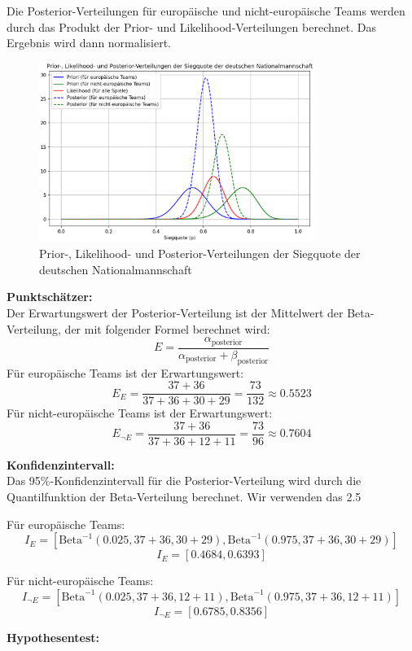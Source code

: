 \documentclass[a4paper,12pt]{article}
\begin{document}
Die Posterior-Verteilungen für europäische und nicht-europäische Teams werden durch das Produkt der Prior- und Likelihood-Verteilungen berechnet. Das Ergebnis wird dann normalisiert.

\begin{figure}[htbp]
  \centering
  \includegraphics[width=0.8\textwidth]{../images/world_cup.png}
  \caption{Prior-, Likelihood- und Posterior-Verteilungen der Siegquote der deutschen Nationalmannschaft}
\end{figure}

\textbf{Punktschätzer:} \\
Der Erwartungswert der Posterior-Verteilung ist der Mittelwert der Beta-Verteilung, der mit folgender Formel berechnet wird:
\[
E = \frac{\alpha_{\text{posterior}}}{\alpha_{\text{posterior}} + \beta_{\text{posterior}}}
\]
Für europäische Teams ist der Erwartungswert:
\[
E_E = \frac{37 + 36}{37 + 36 + 30 + 29} = \frac{73}{132} \approx 0.5523
\]
Für nicht-europäische Teams ist der Erwartungswert:
\[
E_{\neg E}= \frac{37 + 36}{37 + 36 + 12 + 11} = \frac{73}{96} \approx 0.7604
\]

\textbf{Konfidenzintervall:} \\
Das 95\%-Konfidenzintervall für die Posterior-Verteilung wird durch die Quantilfunktion der Beta-Verteilung berechnet. Wir verwenden das 2.5%

Für europäische Teams:
\[
I_E= \left[ \text{Beta}^{-1}(0.025, 37 + 36, 30 + 29), \text{Beta}^{-1}(0.975, 37 + 36, 30 + 29) \right]
\]
\[
I_E = [0.4684, 0.6393]
\]

Für nicht-europäische Teams:
\[
I_{\neg E} = \left[ \text{Beta}^{-1}(0.025, 37 + 36, 12 + 11), \text{Beta}^{-1}(0.975, 37 + 36, 12 + 11) \right]
\]
\[
I_{\neg E} = [0.6785, 0.8356]
\]

\textbf{Hypothesentest:} \\
\end{document}

